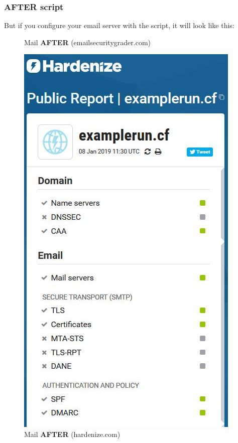 \newpage
\subsubsection{AFTER script}
But if you configure your email server with the script, it will look like this:

\begin{figure}[H]
	\centering
	\caption{Mail \textbf{AFTER} (emailsecuritygrader.com)}
	\label{fig:emailaftertest}
\end{figure}
\begin{figure}[H]
	\centering
	\includegraphics[width=0.3\linewidth]{pics/hardenize_after}
	\caption{Mail \textbf{AFTER} (hardenize.com)}
	\label{fig:hardenizeafter}
\end{figure}
\newpage
